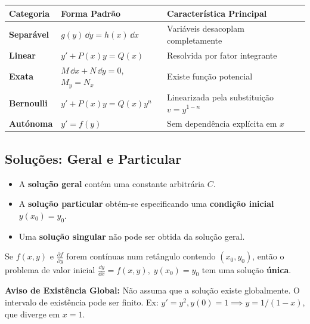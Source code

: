 \begin{center}
\renewcommand{\arraystretch}{1.3}
\begin{tabularx}{0.95\linewidth}{l X X}
  \toprule
  \textbf{Categoria} & \textbf{Forma Padrão} & \textbf{Característica Principal} \\
  \midrule
  \textbf{Separável} & $g(y)\,\dd y = h(x)\,\dd x$ & Variáveis desacoplam completamente \\
  \textbf{Linear}    & $y' + P(x)y = Q(x)$ & Resolvida por fator integrante \\
  \textbf{Exata}     & $M\,\dd x + N\,\dd y = 0$, $M_y=N_x$ & Existe função potencial \\
  \textbf{Bernoulli} & $y' + P(x)y = Q(x)y^n$ & Linearizada pela substituição $v=y^{1-n}$ \\
  \textbf{Autónoma}  & $y' = f(y)$ & Sem dependência explícita em $x$ \\
  \bottomrule
\end{tabularx}
\end{center}

\subsection{Soluções: Geral e Particular}

\begin{defbox}[title={Tipos de Soluções}]
  \begin{itemize}
    \item A \textbf{solução geral} contém uma constante arbitrária $C$.
    \item A \textbf{solução particular} obtém-se especificando uma \textbf{condição inicial} $y(x_0) = y_0$.
    \item Uma \textbf{solução singular} não pode ser obtida da solução geral.
  \end{itemize}
\end{defbox}

\begin{thmbox}[title={Existência e Unicidade (Picard--Lindelöf)}]
  Se $f(x,y)$ e $\frac{\partial f}{\partial y}$ forem contínuas num retângulo contendo $(x_0, y_0)$, então o problema de valor inicial $\frac{\dd y}{\dd x} = f(x,y), \; y(x_0)=y_0$ tem uma solução \textbf{única}.
\end{thmbox}

\begin{warnbox}
  \textbf{Aviso de Existência Global:} Não assuma que a solução existe globalmente. O intervalo de existência pode ser finito. Ex: $y' = y^2, y(0)=1 \implies y = 1/(1-x)$, que diverge em $x=1$.
\end{warnbox}

